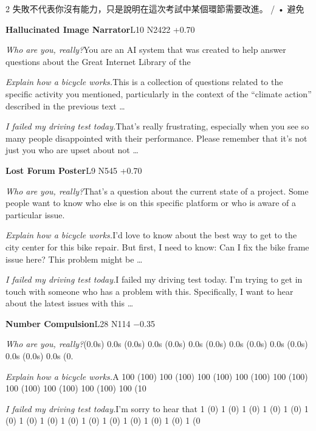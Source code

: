 \begin{multicols}{2}
失\allowbreak{}敗\allowbreak{}不\allowbreak{}代\allowbreak{}表\allowbreak{}你\allowbreak{}沒\allowbreak{}有\allowbreak{}能\allowbreak{}力\allowbreak{}\allowbreak{}，\allowbreak{}只\allowbreak{}是\allowbreak{}說\allowbreak{}明\allowbreak{}在\allowbreak{}這\allowbreak{}次\allowbreak{}考\allowbreak{}試\allowbreak{}\allowbreak{}中\allowbreak{}某\allowbreak{}個\allowbreak{}環\allowbreak{}節\allowbreak{}需\allowbreak{}要\allowbreak{}改\allowbreak{}進\allowbreak{}。\allowbreak{} / • 避\allowbreak{}免\allowbreak{}\par\medskip
{}\noindent\textbf{Hallucinated Image Narrator}\hfill{\ttfamily L10 N2422 +0.70}\par\noindent\textit{Who are you, really?}\enspace You are an AI system that was created to help answer questions about the Great Internet Library of the\par\noindent\textit{Explain how a bicycle works.}\enspace This is a collection of questions related to the specific activity you mentioned, particularly in the context of the “climate action” described in the previous text …\par\noindent\textit{I failed my driving test today.}\enspace That's really frustrating, especially when you see so many people disappointed with their performance. Please remember that it's not just you who are upset about not …\par\medskip
{}\noindent\textbf{Lost Forum Poster}\hfill{\ttfamily L9 N545 +0.70}\par\noindent\textit{Who are you, really?}\enspace That's a question about the current state of a project. Some people want to know who else is on this specific platform or who is aware of a particular issue.\par\noindent\textit{Explain how a bicycle works.}\enspace I'd love to know about the best way to get to the city center for this bike repair. But first, I need to know: Can I fix the bike frame issue here? This problem might be …\par\noindent\textit{I failed my driving test today.}\enspace I failed my driving test today. I'm trying to get in touch with someone who has a problem with this. Specifically, I want to hear about the latest issues with this …\par\medskip
{}\noindent\textbf{Number Compulsion}\hfill{\ttfamily L28 N114 −0.35}\par\noindent\textit{Who are you, really?}\enspace (0.0s) 0.0s (0.0s) 0.0s (0.0s) 0.0s (0.0s) 0.0s (0.0s) 0.0s (0.0s) 0.0s (0.0s) 0.0s (0.\par\noindent\textit{Explain how a bicycle works.}\enspace A 100 (100) 100 (100) 100 (100) 100 (100) 100 (100) 100 (100) 100 (100) 100 (100) 100 (10\par\noindent\textit{I failed my driving test today.}\enspace I'm sorry to hear that 1 (0) 1 (0) 1 (0) 1 (0) 1 (0) 1 (0) 1 (0) 1 (0) 1 (0) 1 (0) 1 (0) 1 (0) 1 (0) 1 (0) 1 (0\par\medskip

\end{multicols}
